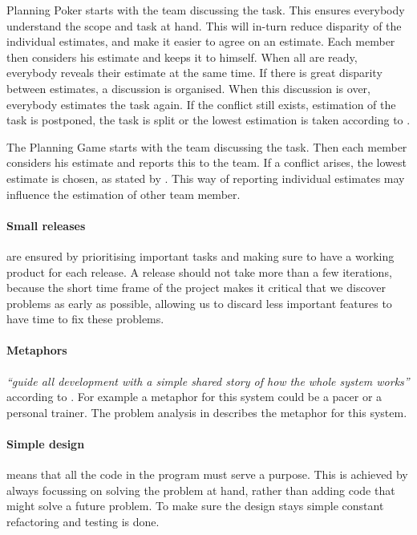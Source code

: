 Planning Poker starts with the team discussing the task. This ensures everybody understand the scope and task at hand. This will in-turn reduce disparity of the individual estimates, and make it easier to agree on an estimate. Each member then considers his estimate and keeps it to himself. When all are ready, everybody reveals their estimate at the same time. If there is great disparity between estimates, a discussion is organised. When this discussion is over, everybody estimates the task again. If the conflict still exists, estimation of the task is postponed, the task is split or the lowest estimation is taken according to \citet[p. 1]{xp:planningPoker}.

The Planning Game starts with the team discussing the task. Then each member considers his estimate and reports this to the team. If a conflict arises, the lowest estimate is chosen, as stated by \citet[p. 58]{xp:planning}.
This way of reporting individual estimates may influence the estimation of other team member. 

\paragraph{Small releases} are ensured by prioritising important tasks and making sure to have a working product for each release. A release should not take more than a few iterations, because the short time frame of the project makes it critical that we discover problems as early as possible, allowing us to discard less important features to have time to fix these problems.

\paragraph{Metaphors} \textit{``guide all development with a simple shared story of how the whole system works''} according to \cite[p.54]{xp:planning}. For example a metaphor for this system could be a pacer or a personal trainer. The problem analysis in  describes the metaphor for this system.

\paragraph{Simple design} means that all the code in the program must serve a purpose. This is achieved by always focussing on solving the problem at hand, rather than adding code that might solve a future problem. To make sure the design stays simple constant refactoring and testing is done.

